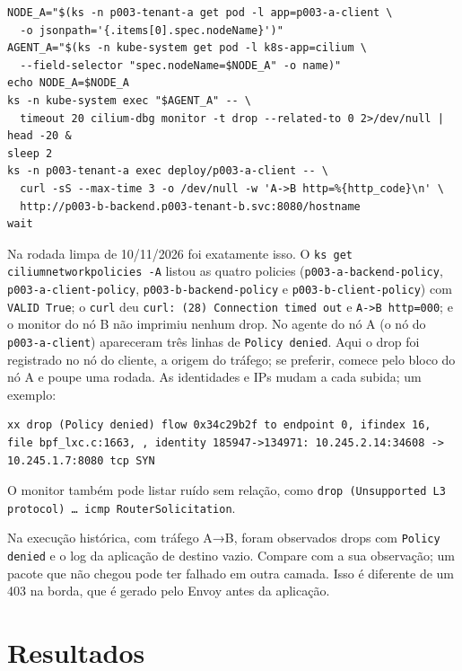 \documentclass[12pt,openany,oneside,a4paper,chapter=TITLE,english,brazil]{abntex2}
\begin{document}
\begin{verbatim}
NODE_A="$(ks -n p003-tenant-a get pod -l app=p003-a-client \
  -o jsonpath='{.items[0].spec.nodeName}')"
AGENT_A="$(ks -n kube-system get pod -l k8s-app=cilium \
  --field-selector "spec.nodeName=$NODE_A" -o name)"
echo NODE_A=$NODE_A
ks -n kube-system exec "$AGENT_A" -- \
  timeout 20 cilium-dbg monitor -t drop --related-to 0 2>/dev/null | head -20 &
sleep 2
ks -n p003-tenant-a exec deploy/p003-a-client -- \
  curl -sS --max-time 3 -o /dev/null -w 'A->B http=%{http_code}\n' \
  http://p003-b-backend.p003-tenant-b.svc:8080/hostname
wait
\end{verbatim}

Na rodada limpa de 10/11/2026 foi exatamente isso. O \texttt{ks get ciliumnetworkpolicies -{}\allowbreak{}A}
listou as quatro policies (\texttt{p003-{}\allowbreak{}a-{}\allowbreak{}backend-{}\allowbreak{}policy}, \texttt{p003-{}\allowbreak{}a-{}\allowbreak{}client-{}\allowbreak{}policy},
\texttt{p003-{}\allowbreak{}b-{}\allowbreak{}backend-{}\allowbreak{}policy} e \texttt{p003-{}\allowbreak{}b-{}\allowbreak{}client-{}\allowbreak{}policy}) com \texttt{VALID True}; o \texttt{curl} deu
\texttt{curl:\allowbreak{} (\allowbreak{}28) Connection timed out} e \texttt{A-{}\allowbreak{}\textgreater{}B http=\allowbreak{}000}; e o monitor do nó B não
imprimiu nenhum drop. No agente do nó A (o nó do \texttt{p003-{}\allowbreak{}a-{}\allowbreak{}client}) apareceram
três linhas de \texttt{Policy denied}. Aqui o drop foi registrado no nó do cliente, a
origem do tráfego; se preferir, comece pelo bloco do nó A e poupe uma rodada. As identidades e IPs mudam a cada subida; um exemplo:

\begin{verbatim}
xx drop (Policy denied) flow 0x34c29b2f to endpoint 0, ifindex 16, file bpf_lxc.c:1663, , identity 185947->134971: 10.245.2.14:34608 -> 10.245.1.7:8080 tcp SYN
\end{verbatim}

O monitor também pode listar ruído sem relação, como
\texttt{drop (\allowbreak{}Unsupported L3 protocol) … icmp Router\allowbreak{}Solicitation}.

Na execução histórica, com tráfego A→B, foram observados drops com
\texttt{Policy denied} e o log da aplicação de destino vazio. Compare com a sua
observação; um pacote que não chegou pode ter falhado em outra camada. Isso é diferente de
um 403 na borda, que é gerado pelo Envoy antes da aplicação.

\section{Resultados}\label{resultados}
\end{document}
